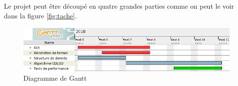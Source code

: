 \documentclass[12pt]{report}
\begin{document}
Le projet peut être découpé en quatre grandes parties comme on peut le
voir dans la figure \ref{fig:tache}.\\


\begin{center}
\begin{figure}[!h]
  \includegraphics[scale=0.5]{img/gantt.png}
  \caption{Diagramme de Gantt}
  \label{fig:gantt}
\end{figure}
\end{center}

{}

\end{document}
